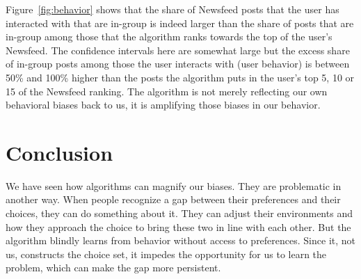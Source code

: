 \documentclass[12pt,letterpaper]{article}
\begin{document}
Figure~\ref{fig:behavior} shows that the share of Newsfeed posts that the user has interacted with that are in-group is indeed larger than the share of posts that are in-group among those that the algorithm ranks towards the top of the user's Newsfeed. The confidence intervals here are somewhat large but the excess share of in-group posts among those the user interacts with (user behavior) is between 50\% and 100\% higher than the posts the algorithm puts in the user's top 5, 10 or 15 of the Newsfeed ranking. The algorithm is not merely reflecting our own behavioral biases back to us, it is amplifying those biases in our behavior.




\section{Conclusion}
We have seen how algorithms can magnify our biases. They are problematic in another way. When people recognize a gap between their preferences and their choices, they can do something about it. They can adjust their environments and how they approach the choice to bring these two in line with each other. But the algorithm blindly learns from behavior without access to preferences. Since it, not us, constructs the choice set, it impedes the opportunity for us to learn the problem, which can make the gap more persistent.
\end{document}
